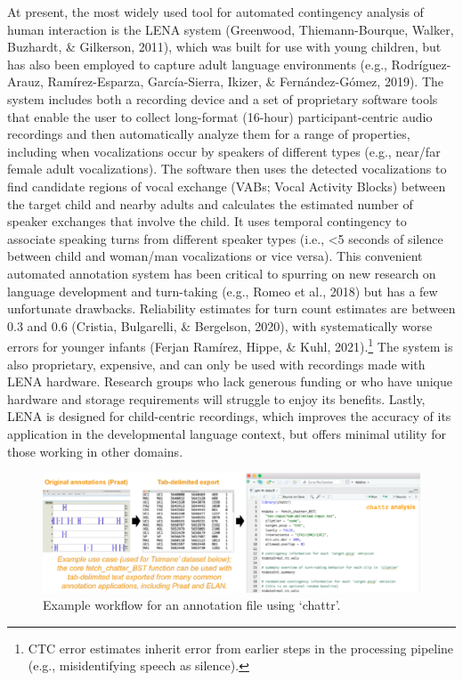 \documentclass[10pt, letterpaper]{article}
\newenvironment{CodeChunk}{}{}
\begin{document}
At present, the most widely used tool for automated contingency analysis
of human interaction is the LENA system (Greenwood, Thiemann-Bourque,
Walker, Buzhardt, \& Gilkerson, 2011), which was built for use with
young children, but has also been employed to capture adult language
environments (e.g., Rodríguez-Arauz, Ramírez-Esparza, García-Sierra,
Ikizer, \& Fernández-Gómez, 2019). The system includes both a recording
device and a set of proprietary software tools that enable the user to
collect long-format (16-hour) participant-centric audio recordings and
then automatically analyze them for a range of properties, including
when vocalizations occur by speakers of different types (e.g., near/far
female adult vocalizations). The software then uses the detected
vocalizations to find candidate regions of vocal exchange (VABs; Vocal
Activity Blocks) between the target child and nearby adults and
calculates the estimated number of speaker exchanges that involve the
child. It uses temporal contingency to associate speaking turns from
different speaker types (i.e., \textless5 seconds of silence between
child and woman/man vocalizations or vice versa). This convenient
automated annotation system has been critical to spurring on new
research on language development and turn-taking (e.g., Romeo et al.,
2018) but has a few unfortunate drawbacks. Reliability estimates for
turn count estimates are between 0.3 and 0.6 (Cristia, Bulgarelli, \&
Bergelson, 2020), with systematically worse errors for younger infants
(Ferjan Ramírez, Hippe, \& Kuhl, 2021).\footnote{CTC error estimates
  inherit error from earlier steps in the processing pipeline (e.g.,
  misidentifying speech as silence).} The system is also proprietary,
expensive, and can only be used with recordings made with LENA hardware.
Research groups who lack generous funding or who have unique hardware
and storage requirements will struggle to enjoy its benefits. Lastly,
LENA is designed for child-centric recordings, which improves the
accuracy of its application in the developmental language context, but
offers minimal utility for those working in other domains.

\begin{CodeChunk}
\begin{figure}[h]

{\centering \includegraphics{figs/workflow-1} 

}

\caption[Example workflow for an annotation file using `chattr']{Example workflow for an annotation file using `chattr'.}\label{fig:workflow}
\end{figure}
\end{CodeChunk}
\end{document}
